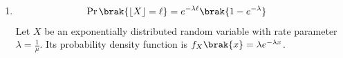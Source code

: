 \begin{enumerate}[label=\thesubsection.\arabic*, ref=\thesubsection.\theenumi]
	Standardizing the interval $[a, b]$ maps the boundaries to the standard normal distribution $Z$. The probability evaluates to the difference of the standard normal Cumulative Distribution Function (CDF), denoted by $\phi\brak{x}$, at these bounds:
	\begin{align}
		P\brak{a \le Y \le b} &= P\brak{\frac{a - \mu}{\sigma} \le Z \le \frac{b - \mu}{\sigma}}
		\\
		&= \phi\brak{\frac{b - n\theta}{\sqrt{n\theta\brak{1-\theta}}}} - \phi\brak{\frac{a - n\theta}{\sqrt{n\theta\brak{1-\theta}}}} \label{eq:DA2025-clt_binomial}
	\end{align}
	\item
	\begin{align}
		\Pr\brak{\lfloor X \rfloor = \ell} &= e^{-\lambda \ell}\brak{1 - e^{-\lambda}} \label{eq:DA2025-exp_geom}
	\end{align}
	\solution
	Let $X$ be an exponentially distributed random variable with rate parameter $\lambda = \frac{1}{\mu}$. Its probability density function is $f_X\brak{x} = \lambda e^{-\lambda x}$. 
	

\end{enumerate}
